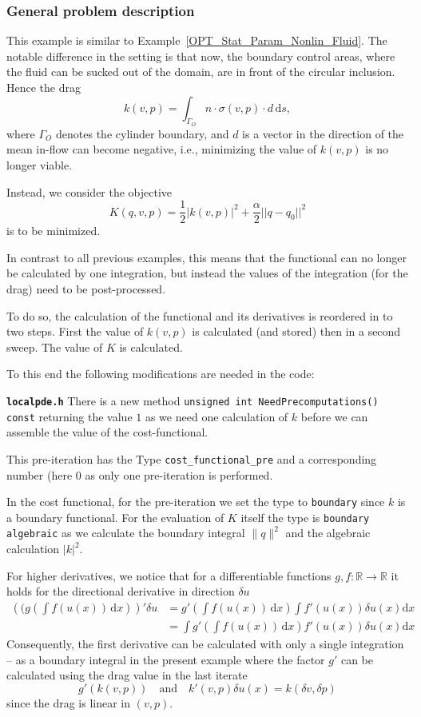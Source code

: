 \subsubsection{General problem description}
This example is similar to Example~\ref{OPT_Stat_Param_Nonlin_Fluid}.
The notable difference in the setting is that now, the boundary control areas, 
where the fluid can be sucked out of the domain, are in front of the 
circular inclusion. Hence the drag
\[
k(v,p) = \int_{\Gamma_O} n\cdot \sigma(v,p)\cdot d \, \mathrm{d}s,
\]
where $\Gamma_O$ denotes the cylinder boundary, and $d$ is a vector in the
direction of the mean in-flow can become negative, i.e., minimizing the 
value of $k(v,p)$ is no longer viable. 

Instead, we consider the objective 
\[
K(q,v,p) = \frac{1}{2}|k(v,p)|^2 + \frac{\alpha}{2}||q - q_0||^2
\] 
is to be minimized.

In contrast to all previous examples, this means that the functional can
no longer be calculated by one integration, but instead the values of the 
integration (for the drag) need to be post-processed.

To do so, the calculation of the functional and its derivatives
is reordered in to two steps. First the value of $k(v,p)$ is
calculated (and stored) then in a second sweep. The value of
$K$ is calculated.

To this end the following modifications are needed in the
code:


\textbf{\texttt{localpde.h}}
There is a new method \texttt{unsigned int NeedPrecomputations() const}
returning the value $1$ as we need one calculation of $k$ before we can
assemble the value of the cost-functional.

This pre-iteration has the Type \texttt{cost\_functional\_pre} and a corresponding
number (here $0$ as only one pre-iteration is performed.

In the cost functional, for the pre-iteration we set the type to
\texttt{boundary} since $k$ is a boundary functional.
For the evaluation of $K$ itself the type is \texttt{boundary algebraic}
as we calculate the boundary integral $\|q\|^2$ and the algebraic calculation
$|{k}|^2$.

For higher derivatives, we notice that for a differentiable functions $g,f\colon \mathbb R\rightarrow \mathbb R$
it holds for the directional derivative in direction $\delta u$
\begin{align*}
 \left((g\left(\int f(u(x))\,\mathrm{d}x\right)\right)'\delta u
  &= g'(\int f(u(x))\,\mathrm{d}x) \int f'(u(x)) \delta u(x) \mathrm{d}x \\
  &= \int g'(\int f(u(x))\,\mathrm{d}x) f'(u(x)) \delta u(x) \mathrm{d}x 
\end{align*}
Consequently, the first derivative can be calculated with only a single integration
-- as a boundary integral in the present example where the 
factor $g'$ can be calculated using the drag value in the 
last iterate  
\[
g'(k(v,p)) \quad\text{and}\quad k'(v,p)\delta u(x) = k(\delta v, \delta p)
\]
since the drag is linear in $(v,p)$.

